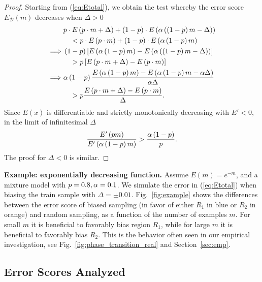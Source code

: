 \documentclass{article}
\newcommand{\myparagraph}[1]{\smallskip\noindent\textbf{#1}}
\newcommand{\Dd}{\mathcal{D}}
\newcommand{\pR}{1}\newcommand{\rR}{2}\newcommand{\prR}{i}
\newcommand{\qDel}{\Delta}
\begin{document}
\begin{proof}
Starting from (\ref{eq:Etotal}), we obtain the test whereby the error score $E_\Dd(m)$ decreases when $\qDel>0$
\begin{equation*}
\begin{split}
&p\cdot E\left(p\cdot m+\qDel\right)+\left(1-p\right)\cdot E\left(\qhard\left(\left(1-p\right)m-\qDel\right)\right)  \\
&\quad<p\cdot E\left(p\cdot m\right)+\left(1-p\right)\cdot E\left(\qhard\left(1-p\right)m\right)\\
\implies  & \left(1-p\right)\left[E\left(\qhard\left(1-p\right)m\right)-E\left(\qhard\left(\left(1-p\right)m-\qDel\right)\right)\right]\\
&\quad>p\left[E\left(p\cdot m+\qDel\right)-E\left(p\cdot m\right)\right]\\
\implies  &\qhard\left(1-p\right)\frac{E\left(\qhard\left(1-p\right)m\right)-E\left(\qhard\left(1-p\right)m-\qhard\qDel \right)}{\qhard \qDel}\\
&\quad> p\frac{E\left(p\cdot m+\qDel\right)-E\left(p\cdot m\right)}{\qDel}.\\
\end{split}
\end{equation*}
Since $E(x)$ is differentiable and strictly monotonically decreasing with $E'<0$, in the limit of infinitesimal $\qDel$ \begin{equation*}
\frac{E'\left(pm\right)}{E'\left(\alpha\left(1-p\right)m\right)}>\frac{\alpha\left(1-p\right)}{p}.
\end{equation*}
The proof for $\qDel<0$ is similar.
\end{proof}

\myparagraph{Example: exponentially decreasing function.}
Assume $E\left(m\right)=e^{-m}$, and a mixture model with $p=0.8,\alpha=0.1$. We simulate the error in (\ref{eq:Etotal}) when biasing the train sample with $\qDel=\pm 0.01$. Fig.~\ref{fig:example} shows the differences between the error score of biased sampling (in favor of either $R_\pR$ in blue or $R_\rR$ in orange) and random sampling, as a function of the number of examples $m$. For small $m$ it is beneficial to favorably bias region $R_\pR$, while for large $m$ it is beneficial to favorably bias $R_\rR$. This is the behavior often seen in our empirical investigation, see Fig.~\ref{fig:phase_transition_real} and Section~\ref{sec:emp}. 

\subsection{Error Scores Analyzed}
\label{sec:error-fs}
\end{document}
